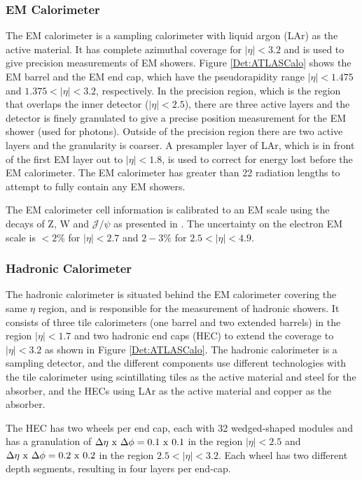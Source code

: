 \subsubsection{EM Calorimeter}

The EM calorimeter is a sampling calorimeter with liquid argon (LAr) as the active material. 
It has complete azimuthal coverage for $|\eta|<3.2$ and is used to give precision measurements of EM showers.
Figure \ref{Det:ATLASCalo} shows the EM barrel and the EM end cap, which have the pseudorapidity range $|\eta|<1.475$ and $1.375<|\eta|<3.2$, respectively.
In the precision region,  which is the region that overlaps the inner detector ($|\eta|<2.5$), there are three active layers and the detector is finely granulated to give a precise position measurement for the EM shower (used for photons).
Outside of the precision region there are two active layers and the granularity is coarser.
A presampler layer of LAr, which is in front of the first EM layer out to $|\eta|<1.8$, is used to correct for energy lost before the EM calorimeter. 
The EM calorimeter has greater than 22 radiation lengths to attempt to fully contain any EM showers.

The EM calorimeter cell information is calibrated to an EM scale using the decays of Z, W and $\mathcal{J}/\psi$ as presented in \cite{ref:ZeeCalib}. 
The uncertainty on the electron EM scale is $<2\%$ for $|\eta|<2.7$ and $2-3\%$ for $2.5<|\eta|<4.9$. 

\subsubsection{Hadronic Calorimeter}



The hadronic calorimeter is situated behind the EM calorimeter covering the same $\eta$ region, and is responsible for the measurement of hadronic showers. 
It consists of three tile calorimeters (one barrel and two extended barrels) in the region $|\eta|<1.7$ and two hadronic end caps (HEC) to extend the coverage to $|\eta|<3.2$ as shown in Figure \ref{Det:ATLASCalo}.
The hadronic calorimeter is a sampling detector, and the different components use different technologies with the tile calorimeter using  scintillating tiles as the active material and steel for the absorber, and the HECs using LAr as the active material and copper as the absorber.

The HEC has two wheels per end cap, each with 32 wedged-shaped modules and has a granulation of $\Delta\eta~\rm{x}~\Delta\phi = 0.1~\rm{x}~0.1$ in the region $|\eta|<2.5$ and $\Delta\eta~\rm{x}~\Delta\phi = 0.2~\rm{x}~0.2$ in the region $2.5<|\eta|<3.2$.
Each wheel has two different depth segments, resulting in four layers per end-cap.

